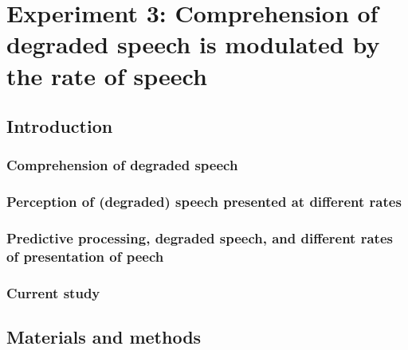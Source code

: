 \documentclass[a4paper, nobind]{templates/ociamthesis}
\begin{document}
\hypertarget{experiment-3-comprehension-of-degraded-speech-is-modulated-by-the-rate-of-speech}{%
\chapter{Experiment 3: Comprehension of degraded speech is modulated by the rate of speech}\label{experiment-3-comprehension-of-degraded-speech-is-modulated-by-the-rate-of-speech}}

\minitoc

\hypertarget{introduction-1}{%
\section{Introduction}\label{introduction-1}}

\hypertarget{comprehension-of-degraded-speech-1}{%
\subsection{Comprehension of degraded speech}\label{comprehension-of-degraded-speech-1}}

\hypertarget{perception-of-degraded-speech-presented-at-different-rates}{%
\subsection{Perception of (degraded) speech presented at different rates}\label{perception-of-degraded-speech-presented-at-different-rates}}

\hypertarget{predictive-processing-degraded-speech-and-different-rates-of-presentation-of-peech}{%
\subsection{Predictive processing, degraded speech, and different rates of presentation of peech}\label{predictive-processing-degraded-speech-and-different-rates-of-presentation-of-peech}}

\hypertarget{current-study}{%
\subsection{Current study}\label{current-study}}

\hypertarget{materials-and-methods-3}{%
\section{Materials and methods}\label{materials-and-methods-3}}
\end{document}
